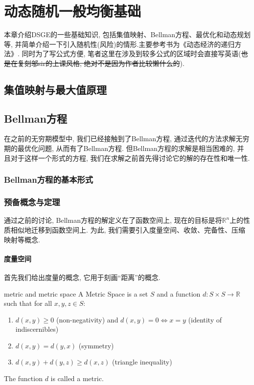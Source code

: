 \chapter{动态随机一般均衡基础}
本章介绍DSGE的一些基础知识, 包括集值映射、Bellman方程、最优化和动态规划等, 并简单介绍一下引入随机性(风险)的情形.主要参考书为《动态经济的递归方法》.
同时为了写公式方便, 笔者这里在涉及到较多公式的区域时会直接写英语(\sout{也是在复刻邬sir的上课风格, 绝对不是因为作者比较懒什么的}).
\section{集值映射与最大值原理}

\section{Bellman方程}
在之前的无穷期模型中, 我们已经接触到了Bellman方程, 通过迭代的方法求解无穷期的最优化问题, 从而有了Bellman方程.
但Bellman方程的求解是相当困难的, 并且对于这样一个形式的方程, 我们在求解之前首先得讨论它的解的存在性和唯一性.
\subsection{Bellman方程的基本形式}

\subsection{预备概念与定理}
{\kaishu 通过之前的讨论, Bellman方程的解定义在了函数空间上, 现在的目标是将$\mathbb{R}^n$上的性质相似地迁移到函数空间上.
为此, 我们需要引入度量空间、收敛、完备性、压缩映射等概念.}
\subsubsection{度量空间}
首先我们给出度量的概念, 它用于刻画“距离”的概念.
\begin{definition}{metric and metric space}
    A Metric Space is a set $S$ and a function $d: S \times S \to \mathbb{R}$ such that for all $x, y, z \in S$:
    \begin{enumerate}
        \item $d(x, y) \geq 0$ (non-negativity) and $d(x, y) = 0 \iff x = y$ (identity of indiscernibles)
        \item $d(x, y) = d(y, x)$ (symmetry)
        \item $d(x, y) + d(y, z) \geq d(x, z)$ (triangle inequality)
    \end{enumerate}
    The function $d$ is called a metric.
\end{definition}

